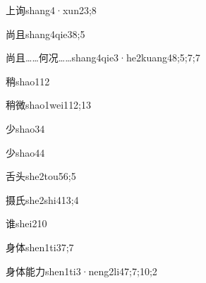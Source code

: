 \begin{verbete}{上询}{shang4·xun2}{3;8}
\end{verbete}

\begin{verbete}{尚且}{shang4qie3}{8;5}
\end{verbete}

\begin{verbete}{尚且……何况……}{shang4qie3·he2kuang4}{8;5;7;7}
\end{verbete}

\begin{verbete}{稍}{shao1}{12}
\end{verbete}

\begin{verbete}{稍微}{shao1wei1}{12;13}
\end{verbete}

\begin{verbete}{少}{shao3}{4}
\end{verbete}

\begin{verbete}{少}{shao4}{4}
\end{verbete}

\begin{verbete}{舌头}{she2tou5}{6;5}
\end{verbete}

\begin{verbete}{摄氏}{she2shi4}{13;4}
\end{verbete}

\begin{verbete}{谁}{shei2}{10}
\end{verbete}

\begin{verbete}{身体}{shen1ti3}{7;7}
\end{verbete}

\begin{verbete}{身体能力}{shen1ti3·neng2li4}{7;7;10;2}
\end{verbete}

